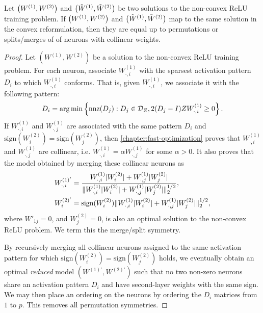 \begin{lemma}\label{lemma:mapping-equality}
    Let \( \left(W^{(1)}, W^{(2)}\right) \) and \( \left(\tilde W^{(1)}, \tilde W^{(2)}\right) \)
    be two solutions to the non-convex ReLU training problem.
    If \( \left(W^{(1)}, W^{(2)}\right) \) and \( \left(\tilde W^{(1)}, \tilde W^{(2)}\right) \) map
    to the same solution in the convex reformulation, then they are equal up to
    permutations or splits/merges of of neurons with collinear weights.
\end{lemma}
\begin{proof}
    Let \( (W^{(1)}, W^{(2)}) \) be a solution to the non-convex ReLU training
    problem.
    For each neuron, associate \( W^{(1)}_{\cdot, i} \) with the sparsest
    activation pattern \( D_i \) to which \( W^{(1)}_{\cdot, i} \) conforms.
    That is, given \( W^{(1)}_{\cdot, i} \), we associate it with the following pattern:
    \[
        D_i = \mathop{\rm arg\,min} \left\{ \text{nnz}(D_j) : D_j \in \mathcal{D}_Z, 2 (D_j - I) Z W^{(1)}_{\cdot, i} \geq 0 \right\}.
    \]
    If \( W^{(1)}_{\cdot, i} \) and \( W^{(1)}_{\cdot, j} \) are associated with the same pattern
    \( D_i \) and \( \text{sign}(W^{(2)}_{i}) = \text{sign}(W^{(2)}_{j}) \),
    then \cref{chapter:fast-optimization} proves that \( W^{(1)}_{\cdot, i} \) and \( W^{(1)}_{\cdot, j} \)
    are collinear, i.e. \( W^{(1)}_{\cdot, i} = \alpha W^{(1)}_{\cdot, j} \) for some \( \alpha > 0 \).
    It also proves that the model obtained by merging these collinear neurons
    as
    \[
        \begin{aligned}
            W^{(1)'}_{\cdot, i}
             & = \frac{W^{(1)}_{\cdot, i}|W^{(2)}_{i}| + W^{(1)}_{\cdot, j}|W^{(2)}_{j}|}{\|W^{(1)}_{\cdot, i}|W^{(2)}_{i}| + W^{(1)}_{\cdot, j}|W^{(2)}_{j}|\|_2^{1/2}}, \\
            W^{(2)'}_{i}
             & = \text{sign}(W^{(2)}_{i})
            \|W^{(1)}_{\cdot, i}|W^{(2)}_{i}| + W^{(1)}_{\cdot, j}|W^{(2)}_{j}|\|_2^{1/2},
        \end{aligned}
    \]
    where \( W'_{1j} = 0 \), and \( W^{(2)}_{j} = 0 \),
    is also an optimal solution to the non-convex ReLU problem.
    We term this the merge/split symmetry.

    By recursively merging all collinear neurons assigned to the same
    activation pattern for which \( \text{sign}(W^{(2)}_{i}) =
    \text{sign}(W^{(2)}_{j}) \) holds, we eventually obtain an optimal
    \emph{reduced} model \( (W^{(1)'}, W^{(2)'}) \) such that
    no two non-zero neurons share an activation pattern \( D_i \) and have
    second-layer weights with the same sign.
    We may then place an ordering on the neurons by ordering the \( D_i \)
    matrices from \( 1 \) to \( p \).
    This removes all permutation symmetries.


\end{proof}
